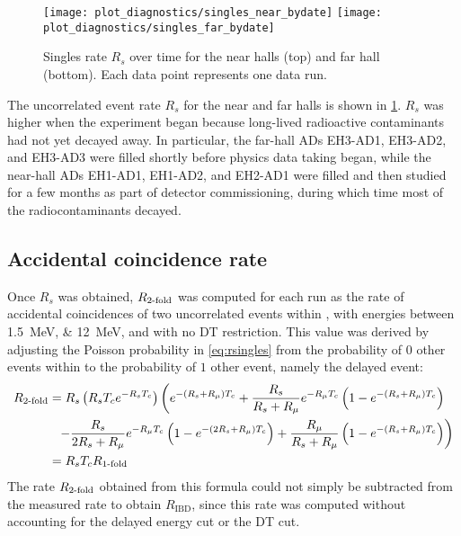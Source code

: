 \begin{figure}
    \centering
    \texttt{[image: plot\_diagnostics/singles\_near\_bydate]}
    \texttt{[image: plot\_diagnostics/singles\_far\_bydate]}
    \caption[Singles rate over time]{
        Singles rate $R_s$ over time for
        the near halls (top) and far hall (bottom).
        Each data point represents one data run.
    }
    \label{fig:singles}
\end{figure}

The uncorrelated event rate $R_s$ for the near and far halls is shown in
\cref{fig:singles}.
$R_s$ was higher when the experiment began because long-lived
radioactive contaminants had not yet decayed away.
In particular, the far-hall ADs EH3-AD1, EH3-AD2, and EH3-AD3
were filled shortly before physics data taking began,
while the near-hall ADs EH1-AD1, EH1-AD2, and EH2-AD1
were filled and then studied for a few months
as part of detector commissioning, during which time
most of the radiocontaminants decayed.

\subsection{Accidental coincidence rate}
\label{subsec:2fold}

Once $R_s$ was obtained, $R_{\text{\ensuremath{2}-fold}}$ was computed for each run
as the rate of accidental coincidences of two uncorrelated events within \tc{},
with energies between \SIlist{1.5;12}{\MeV}, and with no DT restriction.
This value was derived by adjusting the Poisson probability in \cref{eq:rsingles}
from the probability of $0$ other events within \tc{}
to the probability of $1$ other event, namely the delayed event:
\begin{align}
    \label{eq:racc}
    \begin{split}
        R_{\text{\fold{2}}}
                   &= R_s \left(R_s\tc e^{-R_s\tc}\right)
          \left(
              e^{-(R_s + R_\mu)\tc} +
              \frac{R_s}{R_s+R_\mu} e^{-R_\mu\tc}
              \left(
                  1 - e^{-(R_s + R_\mu)\tc}
              \right)
          \right. \\
          &\ \ %
          \left. - \frac{R_s}{2R_s + R_\mu} e^{-R_\mu\tc}
              \left(
                  1 - e^{-(2R_s + R_\mu)\tc}
              \right) +
              \frac{R_\mu}{R_s + R_\mu}
              \left(
                  1 - e^{-(R_s + R_\mu)\tc}
              \right)
          \right) \\
          &= R_s\tc R_{\text{\fold{1}}}
    \end{split}
\end{align}
The rate $R_{\text{\ensuremath{2}-fold}}$ obtained from this formula
could not simply be subtracted from the measured  rate
to obtain $R_{\text{IBD}}$,
since this rate was computed without accounting
for the delayed energy cut or the DT cut.

